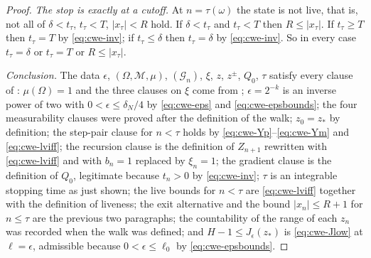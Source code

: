 \begin{proof}
\emph{The stop is exactly at a cutoff.} At $n=\tau(\omega)$ the state is not
live, that is, not all of $\delta<t_\tau$, $t_\tau<T$, $|x_\tau|<R$ hold. If
$\delta<t_\tau$ and $t_\tau<T$ then $R\le|x_\tau|$. If $t_\tau\ge T$ then
$t_\tau=T$ by \eqref{eq:cwe-inv}; if $t_\tau\le\delta$ then $t_\tau=\delta$ by
\eqref{eq:cwe-inv}. So in every case
$t_\tau=\delta$ or $t_\tau=T$ or $R\le|x_\tau|$.

\emph{Conclusion.} The data $\epsilon$, $(\Omega,\mathcal M,\mu)$,
$(\mathcal G_n)$, $\xi$, $z$, $z^\pm$, $Q_0$, $\tau$ satisfy every clause of
: $\mu(\Omega)=1$ and the three clauses on $\xi$ come
from ; $\epsilon=2^{-k}$ is an inverse power of two with
$0<\epsilon\le\delta_N/4$ by \eqref{eq:cwe-eps} and
\eqref{eq:cwe-epsbounds}; the four measurability clauses were proved after the
definition of the walk; $z_0=z_*$ by definition; the step-pair clause for
$n<\tau$ holds by \eqref{eq:cwe-Yp}--\eqref{eq:cwe-Ym} and
\eqref{eq:cwe-lviff}; the recursion clause is the definition of $Z_{n+1}$
rewritten with \eqref{eq:cwe-lviff} and with $b_n=1$ replaced by $\xi_n=1$; the
gradient clause is the definition of $Q_0$, legitimate because $t_n>0$ by
\eqref{eq:cwe-inv}; $\tau$ is an integrable stopping time as just shown; the
live bounds for $n<\tau$ are \eqref{eq:cwe-lviff} together with the definition
of liveness; the exit alternative and the bound $|x_n|\le R+1$ for $n\le\tau$
are the previous two paragraphs; the countability of the range of each $z_n$ was
recorded when the walk was defined; and $H-1\le J_\epsilon(z_*)$ is
\eqref{eq:cwe-Jlow} at $\ell=\epsilon$, admissible because
$0<\epsilon\le\ell_0$ by \eqref{eq:cwe-epsbounds}. \end{proof}
